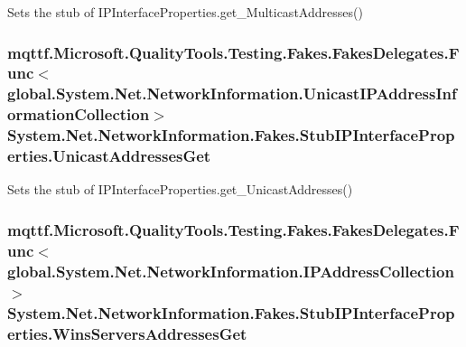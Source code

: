 Sets the stub of I\-P\-Interface\-Properties.\-get\-\_\-\-Multicast\-Addresses()

\hypertarget{class_system_1_1_net_1_1_network_information_1_1_fakes_1_1_stub_i_p_interface_properties_a42cdbf1cb277328f4eaa23c100af615c}{
\subsubsection[{Unicast\-Addresses\-Get}]{\setlength{\rightskip}{0pt plus 5cm}mqttf.\-Microsoft.\-Quality\-Tools.\-Testing.\-Fakes.\-Fakes\-Delegates.\-Func$<$global.\-System.\-Net.\-Network\-Information.\-Unicast\-I\-P\-Address\-Information\-Collection$>$ System.\-Net.\-Network\-Information.\-Fakes.\-Stub\-I\-P\-Interface\-Properties.\-Unicast\-Addresses\-Get}}\label{class_system_1_1_net_1_1_network_information_1_1_fakes_1_1_stub_i_p_interface_properties_a42cdbf1cb277328f4eaa23c100af615c}


Sets the stub of I\-P\-Interface\-Properties.\-get\-\_\-\-Unicast\-Addresses()

\hypertarget{class_system_1_1_net_1_1_network_information_1_1_fakes_1_1_stub_i_p_interface_properties_a89b48d119a965d822ac13630ecb929cb}{
\subsubsection[{Wins\-Servers\-Addresses\-Get}]{\setlength{\rightskip}{0pt plus 5cm}mqttf.\-Microsoft.\-Quality\-Tools.\-Testing.\-Fakes.\-Fakes\-Delegates.\-Func$<$global.\-System.\-Net.\-Network\-Information.\-I\-P\-Address\-Collection$>$ System.\-Net.\-Network\-Information.\-Fakes.\-Stub\-I\-P\-Interface\-Properties.\-Wins\-Servers\-Addresses\-Get}}\label{class_system_1_1_net_1_1_network_information_1_1_fakes_1_1_stub_i_p_interface_properties_a89b48d119a965d822ac13630ecb929cb}


